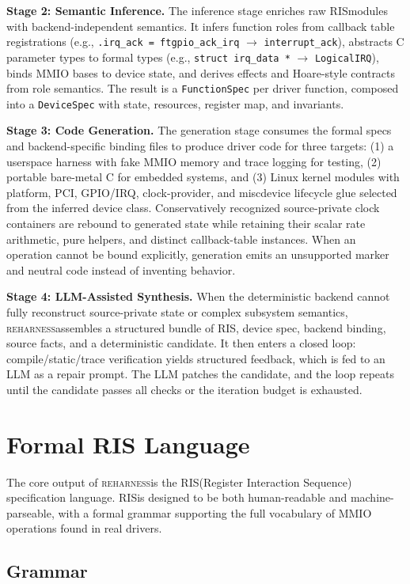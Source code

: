 \documentclass[sigconf,review]{acmart}
\newcommand{\reharness}{\textsc{reharness}}
\newcommand{\rislang}{RIS}
\begin{document}
\textbf{Stage 2: Semantic Inference.} The inference stage enriches raw \rislang modules with backend-independent semantics. It infers function roles from callback table registrations (e.g., \texttt{.irq\_ack = ftgpio\_ack\_irq} $\rightarrow$ \texttt{interrupt\_ack}), abstracts C parameter types to formal types (e.g., \texttt{struct irq\_data *} $\rightarrow$ \texttt{LogicalIRQ}), binds MMIO bases to device state, and derives effects and Hoare-style contracts from role semantics. The result is a \texttt{FunctionSpec} per driver function, composed into a \texttt{DeviceSpec} with state, resources, register map, and invariants.

\textbf{Stage 3: Code Generation.} The generation stage consumes the formal specs and backend-specific binding files to produce driver code for three targets: (1) a userspace harness with fake MMIO memory and trace logging for testing, (2) portable bare-metal C for embedded systems, and (3) Linux kernel modules with platform, PCI, GPIO/IRQ, clock-provider, and miscdevice lifecycle glue selected from the inferred device class. Conservatively recognized source-private clock containers are rebound to generated state while retaining their scalar rate arithmetic, pure helpers, and distinct callback-table instances. When an operation cannot be bound explicitly, generation emits an unsupported marker and neutral code instead of inventing behavior.

\textbf{Stage 4: LLM-Assisted Synthesis.} When the deterministic backend cannot fully reconstruct source-private state or complex subsystem semantics, \reharness assembles a structured bundle of \rislang, device spec, backend binding, source facts, and a deterministic candidate. It then enters a closed loop: compile/static/trace verification yields structured feedback, which is fed to an LLM as a repair prompt. The LLM patches the candidate, and the loop repeats until the candidate passes all checks or the iteration budget is exhausted.

\section{Formal RIS Language}

The core output of \reharness is the \rislang (Register Interaction Sequence) specification language. \rislang is designed to be both human-readable and machine-parseable, with a formal grammar supporting the full vocabulary of MMIO operations found in real drivers.

\subsection{Grammar}
\end{document}
